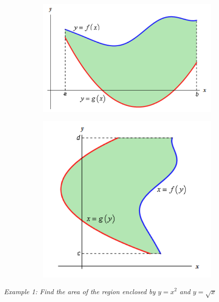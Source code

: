         \begin{figure}[hbt!]
            \centering
            \begin{subfigure}[b]{.45\textwidth}
                \includegraphics[scale=0.8]{Resources/Unit5IntegrationApps/Area1}
            \end{subfigure}
            \begin{subfigure}[b]{.45\textwidth}
                \includegraphics[scale=0.8]{Resources/Unit5IntegrationApps/Area2}
            \end{subfigure}
        \end{figure}

        \noindent \color{blue} \textit{Example 1: Find the area of the region enclosed by
        $y=x^2$ and $y=\sqrt{x}$} \color{black} \\

